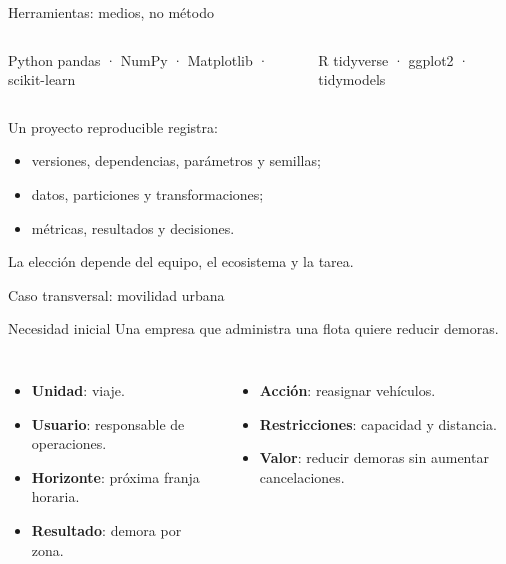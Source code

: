 \documentclass[aspectratio=169,11pt]{beamer}
\newcommand{\concepto}[1]{\textcolor{UAPTeal}{\textbf{#1}}}
\begin{document}
\begin{frame}{Herramientas: medios, no método}
  \begin{columns}[T]
      \begin{block}{Python}
        pandas · NumPy · Matplotlib · scikit-learn
      \end{block}
      \begin{block}{R}
        tidyverse · ggplot2 · tidymodels
      \end{block}
  \end{columns}
  \vspace{0.6em}
  Un proyecto reproducible registra:
  \begin{itemize}
    \item versiones, dependencias, parámetros y semillas;
    \item datos, particiones y transformaciones;
    \item métricas, resultados y decisiones.
  \end{itemize}
  \centering\alert{La elección depende del equipo, el ecosistema y la tarea.}
\end{frame}

\begin{frame}{Caso transversal: movilidad urbana}
  \begin{block}{Necesidad inicial}
    Una empresa que administra una flota quiere reducir demoras.
  \end{block}
  \small
  \begin{columns}[T]
      \begin{itemize}
        \item \concepto{Unidad}: viaje.
        \item \concepto{Usuario}: responsable de operaciones.
        \item \concepto{Horizonte}: próxima franja horaria.
        \item \concepto{Resultado}: demora por zona.
      \end{itemize}
      \begin{itemize}
        \item \concepto{Acción}: reasignar vehículos.
        \item \concepto{Restricciones}: capacidad y distancia.
        \item \concepto{Valor}: reducir demoras sin aumentar cancelaciones.
      \end{itemize}
  \end{columns}
\end{frame}
\end{document}
